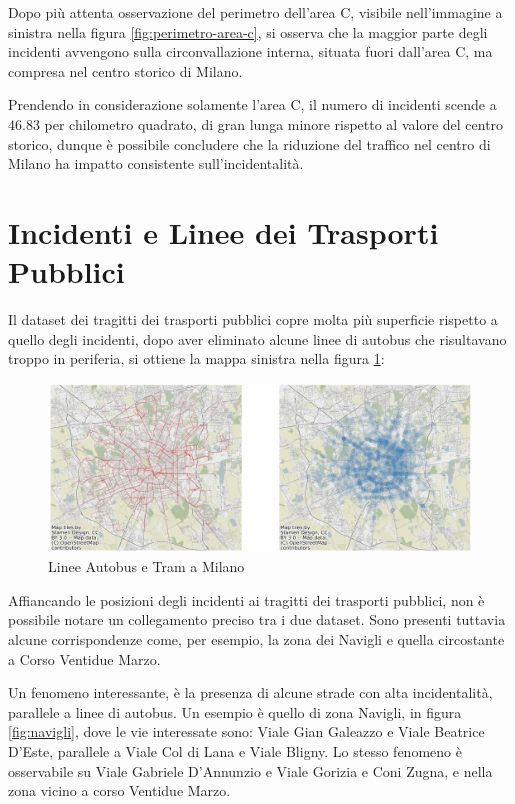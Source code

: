 \documentclass[a4paper,12pt]{report}
\begin{document}
Dopo più attenta osservazione del perimetro dell'area C, visibile nell'immagine a sinistra nella 
figura \ref{fig:perimetro-area-c}, si osserva che la maggior parte degli 
incidenti avvengono sulla circonvallazione interna, 
situata fuori dall'area C, ma compresa nel centro storico di Milano.

Prendendo in considerazione solamente l'area C, il numero di incidenti scende a $46.83$ 
per chilometro quadrato, di gran lunga minore rispetto al valore del centro storico, 
dunque è possibile concludere che la riduzione del traffico nel centro di Milano ha impatto 
consistente sull'incidentalità.

\section{Incidenti e Linee dei Trasporti Pubblici}

Il dataset dei tragitti dei trasporti pubblici copre molta più superficie rispetto a 
quello degli incidenti, dopo aver eliminato alcune linee di autobus che risultavano 
troppo in periferia, si ottiene la mappa sinistra nella figura \ref{fig:geo-trasporti}: 

\begin{figure}
    \hfill\includegraphics[width=0.6\linewidth]{../src/atm/linee_atm.png}\hspace*{\fill}
    \caption{Linee Autobus e Tram a Milano}
    \label{fig:geo-trasporti}
\end{figure}

Affiancando le posizioni degli incidenti ai tragitti dei trasporti pubblici, 
non è possibile notare un collegamento preciso tra i due dataset. 
Sono presenti tuttavia alcune corrispondenze come, per esempio, la zona dei Navigli 
e quella circostante a Corso Ventidue Marzo. 

Un fenomeno interessante, è la presenza di alcune strade con alta incidentalità, 
parallele a linee di autobus. 
Un esempio è quello di zona Navigli, in figura \ref{fig:navigli}, dove le vie interessate sono:
Viale Gian Galeazzo e Viale Beatrice D'Este, parallele a Viale Col di Lana e Viale Bligny.
Lo stesso fenomeno è osservabile su Viale Gabriele D'Annunzio e Viale Gorizia e Coni Zugna, 
e nella zona vicino a corso Ventidue Marzo.
\end{document}
